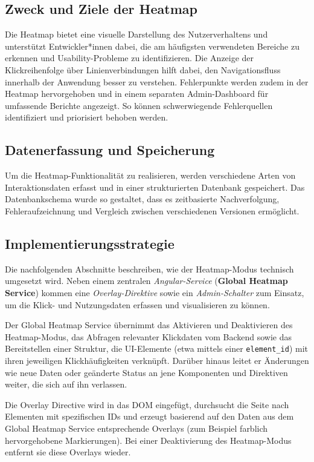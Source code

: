 \documentclass[12pt,oneside]{article}
\begin{document}
\subsection{Zweck und Ziele der Heatmap}
Die Heatmap bietet eine visuelle Darstellung des Nutzerverhaltens und unterstützt Entwickler*innen dabei, die am häufigsten verwendeten Bereiche zu erkennen und Usability-Probleme zu identifizieren. Die Anzeige der Klickreihenfolge über Linienverbindungen hilft dabei, den Navigationsfluss innerhalb der Anwendung besser zu verstehen. Fehlerpunkte werden zudem in der Heatmap hervorgehoben und in einem separaten Admin-Dashboard für umfassende Berichte angezeigt. So können schwerwiegende Fehlerquellen identifiziert und priorisiert behoben werden.

\subsection{Datenerfassung und Speicherung}
Um die Heatmap-Funktionalität zu realisieren, werden verschiedene Arten von Interaktionsdaten erfasst und in einer strukturierten Datenbank gespeichert. Das Datenbankschema wurde so gestaltet, dass es zeitbasierte Nachverfolgung, Fehleraufzeichnung und Vergleich zwischen verschiedenen Versionen ermöglicht.

\subsection{Implementierungsstrategie}
Die nachfolgenden Abschnitte beschreiben, wie der Heatmap-Modus technisch umgesetzt wird. Neben einem zentralen \emph{Angular-Service} (\textbf{Global Heatmap Service}) kommen eine \emph{Overlay-Direktive} sowie ein \emph{Admin-Schalter} zum Einsatz, um die Klick- und Nutzungsdaten erfassen und visualisieren zu können.

Der Global Heatmap Service übernimmt das Aktivieren und Deaktivieren des Heatmap-Modus, das Abfragen relevanter Klickdaten vom Backend sowie das Bereitstellen einer Struktur, die UI-Elemente (etwa mittels einer \lstinline|element_id|) mit ihren jeweiligen Klickhäufigkeiten verknüpft. Darüber hinaus leitet er Änderungen wie neue Daten oder geänderte Status an jene Komponenten und Direktiven weiter, die sich auf ihn verlassen.

Die Overlay Directive wird in das DOM eingefügt, durchsucht die Seite nach Elementen mit spezifischen IDs und erzeugt basierend auf den Daten aus dem Global Heatmap Service entsprechende Overlays (zum Beispiel farblich hervorgehobene Markierungen). Bei einer Deaktivierung des Heatmap-Modus entfernt sie diese Overlays wieder.
\end{document}
